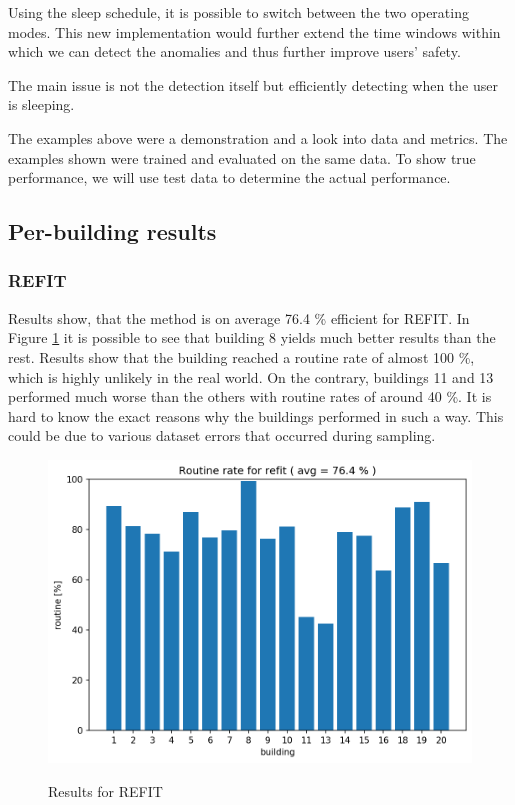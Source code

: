 Using the sleep schedule, it is possible to switch between the two operating modes. 
This new implementation would further extend the time windows within which we can detect the anomalies and thus further improve users' safety.

The main issue is not the detection itself but efficiently detecting
when the user is sleeping. 

The examples above were a demonstration and a look into data and metrics. 
The examples shown were trained and evaluated on the same data. 
To show true performance, we will use test data to determine the actual performance. 


\subsection{Per-building results}
\subsubsection{REFIT}

Results show, that the method is on average 76.4 \% efficient for REFIT.  
In Figure \ref{fig:refit_res} it is possible to see that building 8 yields much better results than the rest.
Results show that the building reached a routine rate of almost 100 \%, which is highly unlikely in the real world. 
On the contrary, buildings 11 and 13 performed much worse than the others with routine rates of around 40 \%.
It is hard to know the exact reasons why the buildings performed in such a way.
This could be due to various dataset errors that occurred during sampling.

\begin{figure}[H]
	\centering
	\caption{Results for REFIT}
	\includegraphics[width=.8\textwidth]{Figures/EC/refit_res.png}
	\label{fig:refit_res}
\end{figure}

